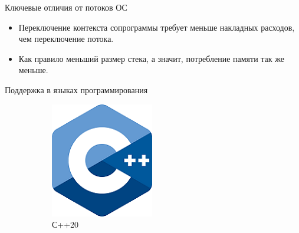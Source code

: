 \begin{frame}{Ключевые отличия от потоков ОС}
	\begin{itemize}
		\item Переключение контекста сопрограммы требует меньше накладных расходов, чем переключение потока.
		\item Как правило меньший размер стека, а значит, потребление памяти так же меньше.
	\end{itemize}
\end{frame}

\begin{frame}{Поддержка в языках программирования}
	\begin{figure}
	\centering
	\hfill
	\begin{subfigure}[b]{0.22\linewidth}
		\includegraphics[width=\linewidth]{images/cpp.png}
		\caption{С++20}
	\end{subfigure}
	\hfill
	\begin{subfigure}[b]{0.25\linewidth}

\end{subfigure}
\end{figure}
\end{frame}
